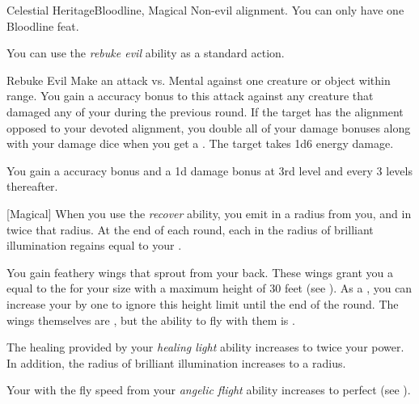     \begin{feat}{Celestial Heritage}{Bloodline, Magical}
        \featpre Non-evil alignment.
         You can only have one Bloodline feat.

         You can use the \textit{rebuke evil} ability as a standard action.
        \begin{activeability}{Rebuke Evil}
            \rankline
            Make an attack vs. Mental against one creature or object within \rngmed range.
            You gain a  accuracy bonus to this attack against any creature that damaged any of your  during the previous round.
            If the target has the alignment opposed to your devoted alignment, you double all of your damage bonuses along with your damage dice when you get a .
            \hit The target takes 1d6 \add {} energy damage.

            \rankline
            You gain a  accuracy bonus and a \plus1d damage bonus at 3rd level and every 3 levels thereafter.
        \end{activeability}

        [Magical] When you use the \textit{recover} ability, you  emit  in a \medarea radius  from you, and  in twice that radius.
        At the end of each round, each  in the radius of brilliant illumination regains  equal to your .

         You gain feathery wings that sprout from your back.
        These wings grant you a  equal to the  for your size with a maximum height of 30 feet (see ).
        As a , you can increase your  by one to ignore this height limit until the end of the round.
        The wings themselves are , but the ability to fly with them is .

         The healing provided by your \textit{healing light} ability increases to twice your power.
        In addition, the radius of brilliant illumination increases to a \hugearea radius.

         Your  with the fly speed from your \textit{angelic flight} ability increases to perfect (see ).
    \end{feat}

